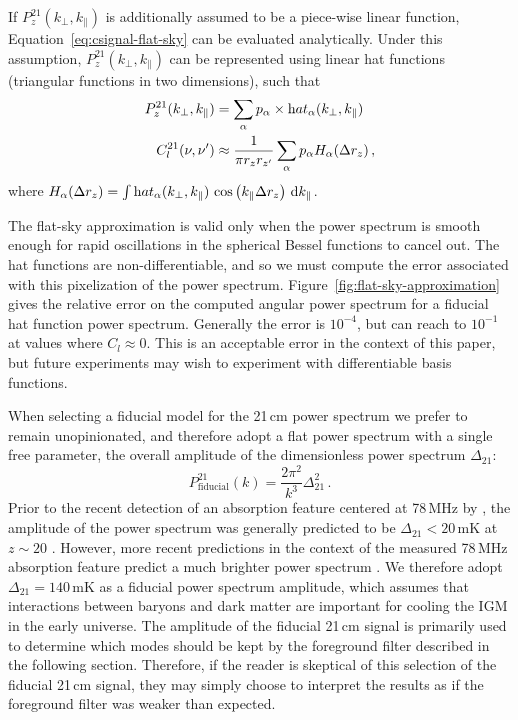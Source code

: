 \begin{bibunit}
If $P_z^{21}(k_\perp, k_\parallel)$ is additionally assumed to be a piece-wise linear function,
Equation~\ref{eq:csignal-flat-sky} can be evaluated analytically. Under this assumption,
$P_z^{21}(k_\perp, k_\parallel)$ can be represented using linear hat functions (triangular functions
in two dimensions), such that
\begin{align}
    P_z^{21}(k_\perp, k_\parallel) &= \sum_\alpha p_\alpha
        \times {\rm hat}_\alpha(k_\perp, k_\parallel)
        \label{eq:palpha} \\
    C^{21}_l(\nu, \nu^\prime) &\approx
        \frac{1}{\pi r_z r_{z^\prime}}
        \sum_\alpha p_\alpha H_\alpha(\Delta r_z)\,,
\end{align}
where $H_\alpha(\Delta r_z) = \int {\rm hat}_\alpha(k_\perp, k_\parallel) \, \cos\left(k_\parallel
\Delta r_z\right) \, \d k_\parallel$.

The flat-sky approximation is valid only when the power spectrum is smooth enough for rapid
oscillations in the spherical Bessel functions to cancel out. The hat functions are
non-differentiable, and so we must compute the error associated with this pixelization of the power
spectrum. Figure~\ref{fig:flat-sky-approximation} gives the relative error on the computed angular
power spectrum for a fiducial hat function power spectrum. Generally the error is $10^{-4}$, but can
reach to $10^{-1}$ at values where $C_l \approx 0$. This is an acceptable error in the context of
this paper, but future experiments may wish to experiment with differentiable basis functions.

When selecting a fiducial model for the 21\,cm power spectrum we prefer to remain unopinionated, and
therefore adopt a flat power spectrum with a single free parameter, the overall amplitude of the
dimensionless power spectrum $\Delta_{21}$:
\begin{equation}
    P_\text{fiducial}^{21}(k) = \frac{2\pi^2}{k^3}\Delta_{21}^2\,.
\end{equation}
Prior to the recent detection of an absorption feature centered at 78\,MHz by
\citet{2018Natur.555...67B}, the amplitude of the power spectrum was generally predicted to be
$\Delta_{21} < 20\,\text{mK}$ at $z\sim 20$ \citep[e.g.,][]{2014MNRAS.437L..36F}. However, more
recent predictions in the context of the measured 78\,MHz absorption feature predict a much brighter
power spectrum \citep[e.g.][]{2018Natur.555...71B, 2018arXiv180503254K}. We therefore adopt
$\Delta_{21} = 140\,\text{mK}$ as a fiducial power spectrum amplitude, which assumes that
interactions between baryons and dark matter are important for cooling the IGM in the early
universe. The amplitude of the fiducial 21\,cm signal is primarily used to determine which modes
should be kept by the foreground filter described in the following section. Therefore, if the reader
is skeptical of this selection of the fiducial 21\,cm signal, they may simply choose to interpret
the results as if the foreground filter was weaker than expected.


\end{bibunit}
